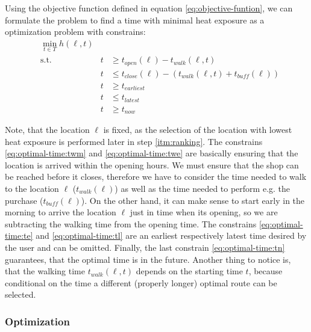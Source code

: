 Using the objective function defined in equation \eqref{eq:objective-funtion}, we can formulate the problem to find a time with minimal heat exposure as a optimization problem with constrains:
\begin{subequations}
	\label{eq:optimal-time}
	\begin{alignat}{2}
	&\min_{t \in T} h(\ell, t) && \label{eq:optimal-time:of} \\
	&\text{s.t.} & t & \geq t_{open}(\ell)-t_{walk}(\ell, t) \label{eq:optimal-time:twm}\\
	&	& t & \leq   t_{close}(\ell)-(t_{walk}(\ell, t)+t_{buff}(\ell))	\label{eq:optimal-time:twe}\\
	&	&  t & \geq t_{earliest} \label{eq:optimal-time:te} \\
	&	&  t & \leq t_{latest} \label{eq:optimal-time:tl} \\
	&  & t  & \geq t_{now} \label{eq:optimal-time:tn} 
	\end{alignat}
\end{subequations}

Note, that the location $\ell$ is fixed, as the selection of the location with lowest heat exposure is performed later in step \ref{itm:ranking}. The constrains \eqref{eq:optimal-time:twm} and \eqref{eq:optimal-time:twe} are  basically ensuring that the location is arrived within the opening hours. We must ensure that the shop can be reached before it closes, therefore we have to consider the time needed to walk to the location $\ell$ ($t_{walk}(\ell)$) as well as the time needed to perform e.g. the purchase ($t_{buff}(\ell)$). On the other hand, it can make sense to start early in the morning to arrive the location $\ell$ just in time when its opening, so we are subtracting the walking time from the opening time. The constrains \eqref{eq:optimal-time:te} and \eqref{eq:optimal-time:tl} are an earliest respectively latest time desired by the user and can be omitted. Finally, the last constrain  \eqref{eq:optimal-time:tn}  guarantees, that the optimal time is in the future. Another thing to notice is, that the walking time $t_{walk}(\ell, t)$ depends on the starting time $t$, because conditional on the time a different (properly longer) optimal route can be selected.

 \subsubsection{Optimization \label{sec:optimization}}
 
